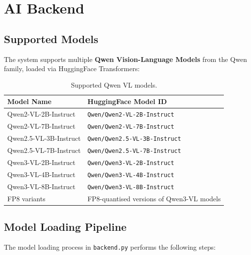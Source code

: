 \documentclass[12pt,a4paper]{article}
\begin{document}
\section{AI Backend}

\subsection{Supported Models}

The system supports multiple \textbf{Qwen Vision-Language Models} from the Qwen family, loaded via HuggingFace Transformers:

\begin{table}[H]
\centering
\caption{Supported Qwen VL models.}
\label{tab:models}
\begin{tabular}{@{}ll@{}}
\toprule
\textbf{Model Name} & \textbf{HuggingFace Model ID} \\
\midrule
Qwen2-VL-2B-Instruct & \texttt{Qwen/Qwen2-VL-2B-Instruct} \\
Qwen2-VL-7B-Instruct & \texttt{Qwen/Qwen2-VL-7B-Instruct} \\
Qwen2.5-VL-3B-Instruct & \texttt{Qwen/Qwen2.5-VL-3B-Instruct} \\
Qwen2.5-VL-7B-Instruct & \texttt{Qwen/Qwen2.5-VL-7B-Instruct} \\
Qwen3-VL-2B-Instruct & \texttt{Qwen/Qwen3-VL-2B-Instruct} \\
Qwen3-VL-4B-Instruct & \texttt{Qwen/Qwen3-VL-4B-Instruct} \\
Qwen3-VL-8B-Instruct & \texttt{Qwen/Qwen3-VL-8B-Instruct} \\
FP8 variants & FP8-quantised versions of Qwen3-VL models \\
\bottomrule
\end{tabular}
\end{table}

\subsection{Model Loading Pipeline}

The model loading process in \texttt{backend.py} performs the following steps:
\end{document}
